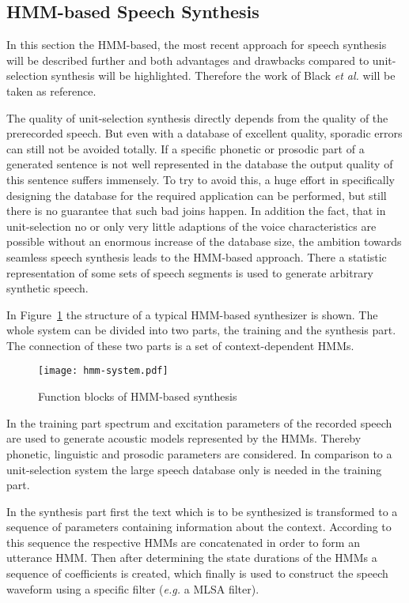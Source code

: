 \subsection{\ac{HMM}-based Speech Synthesis}
\label{subsec:hmmspeech}

In this section the \ac{HMM}-based, the most recent approach for speech synthesis will be described further and both advantages and drawbacks compared to unit-selection synthesis will be highlighted. Therefore the work of Black \textit{et al.} \cite{black:statistical} will be taken as reference.

The quality of unit-selection synthesis directly depends from the quality of the prerecorded speech. But even with a database of excellent quality, sporadic errors can still not be avoided totally. If a specific phonetic or prosodic part of a generated sentence is not well represented in the database the output quality of this sentence suffers immensely. To try to avoid this, a huge effort in specifically designing the database for the required application can be performed, but still there is no guarantee that such bad joins happen. In addition the fact, that in unit-selection no or only very little adaptions of the voice characteristics are possible without an enormous increase of the database size, the ambition towards seamless speech synthesis leads to the \ac{HMM}-based approach. There a statistic representation of some sets of speech segments is used to generate arbitrary synthetic speech.

In Figure~\ref{fig:hmm} the structure of a typical \ac{HMM}-based synthesizer is shown. The whole system can be divided into two parts, the training and the synthesis part. The connection of these two parts is a set of context-dependent \acp{HMM}. 

\begin{figure}[h]
	\texttt{[image: hmm-system.pdf]}
	\caption{Function blocks of \ac{HMM}-based synthesis \cite{black:statistical}}
	\label{fig:hmm}
\end{figure}

In the training part spectrum and excitation parameters %
of the recorded speech are used to generate acoustic models represented by the \acp{HMM}. Thereby phonetic, linguistic and prosodic parameters are considered. In comparison to a unit-selection system the large speech database only is needed in the training part.

In the synthesis part first the text which is to be synthesized is transformed to a sequence of parameters containing information about the context. %
According to this sequence the respective \acp{HMM} are concatenated in order to form an utterance \ac{HMM}. Then after determining the state durations of the \acp{HMM} a sequence of coefficients is created, which finally is used to construct the speech waveform using a specific filter (\textit{e.g.} a \ac{MLSA} filter). %

